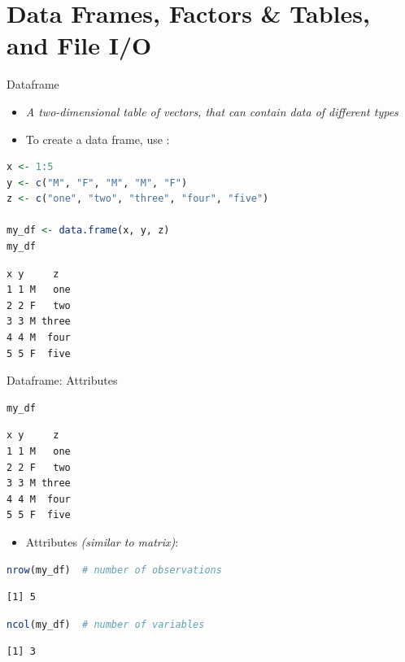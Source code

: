 \section{Data Frames, Factors \& Tables, and File I/O}

\sectionframe

\begin{frame}[fragile]{Dataframe}
\begin{itemize}
  \item \textit{A two-dimensional table of vectors, that can contain data of different types}
  \item To create a data frame, use :
\end{itemize}
\begin{lstlisting}[language=R]
x <- 1:5
y <- c("M", "F", "M", "M", "F")
z <- c("one", "two", "three", "four", "five")

my_df <- data.frame(x, y, z)
my_df
\end{lstlisting}
\begin{lstlisting}[style=output]
  x y     z
1 1 M   one
2 2 F   two
3 3 M three
4 4 M  four
5 5 F  five
\end{lstlisting}
\end{frame}

\begin{frame}[fragile]{Dataframe: Attributes}
\begin{lstlisting}[language=R]
my_df
\end{lstlisting}
\begin{lstlisting}[style=output]
  x y     z
1 1 M   one
2 2 F   two
3 3 M three
4 4 M  four
5 5 F  five
\end{lstlisting}
\begin{itemize}
  \item Attributes \textit{(similar to matrix)}:
\end{itemize}
\begin{lstlisting}[language=R]
nrow(my_df)  # number of observations
\end{lstlisting}
\begin{lstlisting}[style=output]
[1] 5
\end{lstlisting}
\begin{lstlisting}[language=R]
ncol(my_df)  # number of variables
\end{lstlisting}
\begin{lstlisting}[style=output]
[1] 3
\end{lstlisting}
\end{frame}

